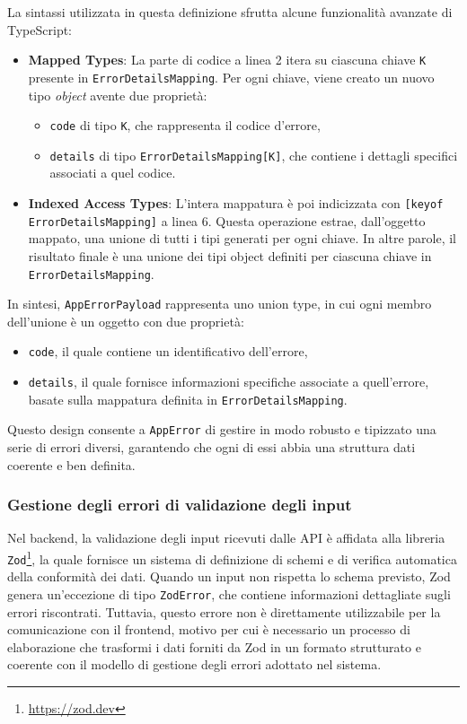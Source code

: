 \newpage

La sintassi utilizzata in questa definizione sfrutta alcune funzionalità avanzate di TypeScript:
\begin{itemize}
  \item \textbf{Mapped Types}: La parte di codice a linea 2 itera su ciascuna chiave \texttt{K} presente in \texttt{ErrorDetailsMapping}. Per ogni chiave, viene creato un nuovo tipo \textit{object} avente due proprietà:
    \begin{itemize}
      \item \texttt{code} di tipo \texttt{K}, che rappresenta il codice d’errore,
      \item \texttt{details} di tipo \texttt{ErrorDetailsMapping[K]}, che contiene i dettagli specifici associati a quel codice.
    \end{itemize}

  \item \textbf{Indexed Access Types}: L'intera mappatura è poi indicizzata con \texttt{[keyof ErrorDetailsMapping]} a linea 6. Questa operazione estrae, dall'oggetto mappato, una unione di tutti i tipi generati per ogni chiave. In altre parole, il risultato finale è una unione dei tipi object definiti per ciascuna chiave in \texttt{ErrorDetailsMapping}.
\end{itemize}

In sintesi, \texttt{AppErrorPayload} rappresenta uno union type, in cui ogni membro dell'unione è un oggetto con due proprietà:
\begin{itemize}
  \item \texttt{code}, il quale contiene un identificativo dell'errore,
  \item \texttt{details}, il quale fornisce informazioni specifiche associate a quell'errore, basate sulla mappatura definita in \texttt{ErrorDetailsMapping}.
\end{itemize}

Questo design consente a \texttt{AppError} di gestire in modo robusto e tipizzato una serie di errori diversi, garantendo che ogni di essi abbia una struttura dati coerente e ben definita.

\subsubsection{Gestione degli errori di validazione degli input}\label{sec:input-validation-errors}
Nel backend, la validazione degli input ricevuti dalle API è affidata alla libreria \texttt{Zod}\footnote{\url{https://zod.dev}}, la quale fornisce un sistema di definizione di schemi e di verifica automatica della conformità dei dati. Quando un input non rispetta lo schema previsto, Zod genera un'eccezione di tipo \texttt{ZodError}, che contiene informazioni dettagliate sugli errori riscontrati. Tuttavia, questo errore non è direttamente utilizzabile per la comunicazione con il frontend, motivo per cui è necessario un processo di elaborazione che trasformi i dati forniti da Zod in un formato strutturato e coerente con il modello di gestione degli errori adottato nel sistema.


